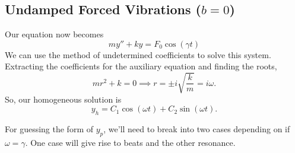 \subsection{Undamped Forced Vibrations ($b = 0$)}
\noindent
Our equation now becomes
\begin{equation*}
	my'' + ky = F_0\cos{(\gamma t)}
\end{equation*}
We can use the method of undetermined coefficients to solve this system.\\

\noindent
Extracting the coefficients for the auxiliary equation and finding the roots,
\begin{equation*}
	mr^2 + k = 0 \implies r = \pm i\sqrt{\frac{k}{m}} = i\omega.
\end{equation*}
So, our homogeneous solution is
\begin{equation*}
	y_h = C_1\cos{(\omega t)} + C_2\sin{(\omega t)}.
\end{equation*}

\noindent
For guessing the form of $y_p$, we'll need to break into two cases depending on if $\omega = \gamma$. One case will give rise to beats and the other resonance.


